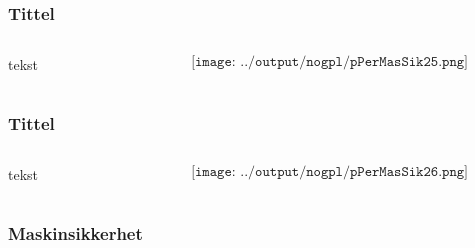 \documentclass[aspectratio=169,xcolor=dvipsnames]{beamer}
\begin{document}
\begin{frame}
	\frametitle{Tittel}
	\begin{columns}
		\begin{column}{0.5\textwidth}
tekst
			
		\end{column}

		\begin{column}{0.5\textwidth}
	$$\texttt{[image: ../output/nogpl/pPerMasSik25.png]}$$
		\end{column}
	\end{columns}
\end{frame}

\begin{frame}
	\frametitle{Tittel}
	\begin{columns}
		\begin{column}{0.5\textwidth}
tekst
			
		\end{column}

		\begin{column}{0.5\textwidth}
	$$\texttt{[image: ../output/nogpl/pPerMasSik26.png]}$$
		\end{column}
	\end{columns}
\end{frame}

\begin{frame}
	\frametitle{Maskinsikkerhet}
\end{frame}
\end{document}
